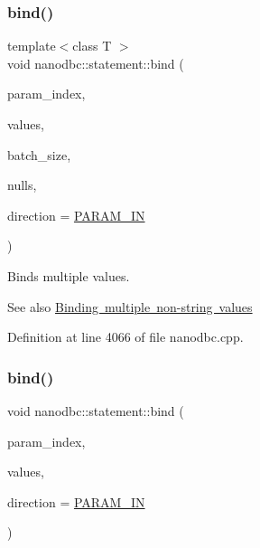 \subsubsection{\texorpdfstring{bind()}{bind()}\hspace{0.1cm}{\footnotesize\ttfamily [3/6]}}
{\footnotesize\ttfamily template$<$class T $>$ \\
void nanodbc\+::statement\+::bind (\begin{DoxyParamCaption}\item[{short}]{param\+\_\+index,  }\item[{T const $\ast$}]{values,  }\item[{std\+::size\+\_\+t}]{batch\+\_\+size,  }\item[{bool const $\ast$}]{nulls,  }\item[{\mbox{\hyperlink{classnanodbc_1_1statement_a523142f53cbbee8d68a074da993e7fa6}{param\+\_\+direction}}}]{direction = {\ttfamily \mbox{\hyperlink{classnanodbc_1_1statement_a523142f53cbbee8d68a074da993e7fa6ae33f42ce0677d00c291ff4d8e39f99de}{P\+A\+R\+A\+M\+\_\+\+IN}}} }\end{DoxyParamCaption})}



Binds multiple values. 

\begin{DoxySeeAlso}{See also}
\mbox{\hyperlink{group__bind__multi}{Binding multiple non-\/string values}} 
\end{DoxySeeAlso}


Definition at line 4066 of file nanodbc.\+cpp.

\mbox{\label{group__bind__multi_gac04830aadf2e00d3a3d05af8690eb241}} 
\subsubsection{\texorpdfstring{bind()}{bind()}\hspace{0.1cm}{\footnotesize\ttfamily [4/6]}}
{\footnotesize\ttfamily void nanodbc\+::statement\+::bind (\begin{DoxyParamCaption}\item[{short}]{param\+\_\+index,  }\item[{std\+::vector$<$ std\+::vector$<$ uint8\+\_\+t $>$$>$ const \&}]{values,  }\item[{\mbox{\hyperlink{classnanodbc_1_1statement_a523142f53cbbee8d68a074da993e7fa6}{param\+\_\+direction}}}]{direction = {\ttfamily \mbox{\hyperlink{classnanodbc_1_1statement_a523142f53cbbee8d68a074da993e7fa6ae33f42ce0677d00c291ff4d8e39f99de}{P\+A\+R\+A\+M\+\_\+\+IN}}} }\end{DoxyParamCaption})}



